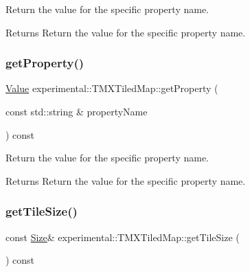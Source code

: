 Return the value for the specific property name.

\begin{DoxyReturn}{Returns}
Return the value for the specific property name. 
\end{DoxyReturn}
\mbox{\label{classexperimental_1_1TMXTiledMap_abaa5b2b023b8b44f71c6bbfcafe1adce}} 
\subsubsection{\texorpdfstring{get\+Property()}{getProperty()}\hspace{0.1cm}{\footnotesize\ttfamily [2/2]}}
{\footnotesize\ttfamily \hyperlink{classValue}{Value} experimental\+::\+T\+M\+X\+Tiled\+Map\+::get\+Property (\begin{DoxyParamCaption}\item[{const std\+::string \&}]{property\+Name }\end{DoxyParamCaption}) const}

Return the value for the specific property name.

\begin{DoxyReturn}{Returns}
Return the value for the specific property name. 
\end{DoxyReturn}
\mbox{\label{classexperimental_1_1TMXTiledMap_a4b40738cbf1cc2e30bef4e3dd1a8d3aa}} 
\subsubsection{\texorpdfstring{get\+Tile\+Size()}{getTileSize()}\hspace{0.1cm}{\footnotesize\ttfamily [1/2]}}
{\footnotesize\ttfamily const \hyperlink{classSize}{Size}\& experimental\+::\+T\+M\+X\+Tiled\+Map\+::get\+Tile\+Size (\begin{DoxyParamCaption}{ }\end{DoxyParamCaption}) const\hspace{0.3cm}{\ttfamily [inline]}}

